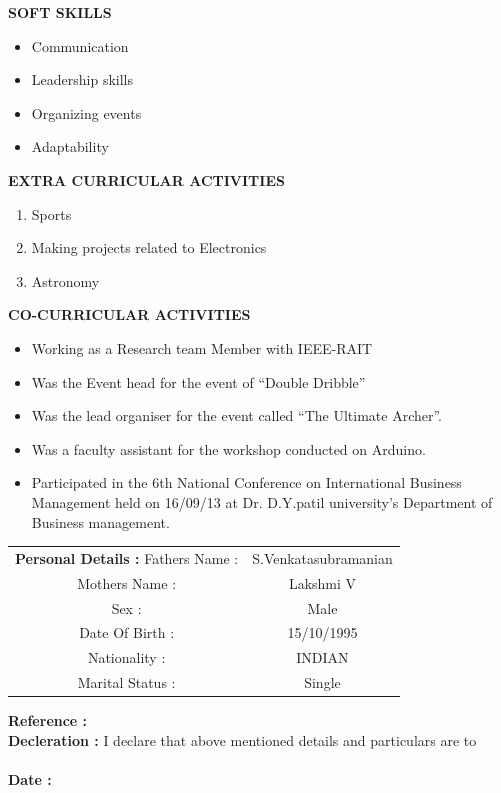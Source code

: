 \documentclass[a4paper]{article}
\begin{document}
\begin{flushleft}
\textbf {SOFT SKILLS}\\
\begin{itemize}
\item Communication
\item Leadership skills
\item Organizing events
\item Adaptability
\end{itemize}
\end{flushleft}

\begin{flushleft}
\textbf {EXTRA CURRICULAR ACTIVITIES}\\
\begin{enumerate}
\item Sports
\item Making projects related to Electronics
\item Astronomy
\end{enumerate}
\end{flushleft}


\begin{flushleft}
\vspace{2in}
\textbf {CO-CURRICULAR ACTIVITIES}\\
\begin{itemize}
\item Working as a Research team Member with IEEE-RAIT
\item 	Was the Event head for the event of  “Double Dribble”
\item 	Was the lead organiser for the event called “The Ultimate Archer”.
\item 	Was a  faculty assistant for the workshop conducted on Arduino.
\item 	Participated in the 6th National Conference on International Business Management held on 16/09/13 at Dr. D.Y.patil university’s Department of Business management.
\end{itemize}
\end{flushleft}

\vspace{2mm}
\begin{flushleft}
\begin{tabular}{ cc }
\textbf {Personal Details :  }
 \hfill Fathers Name : & S.Venkatasubramanian  \\ 
 \hfill Mothers Name : & Lakshmi V \\  
 \hfill Sex : & Male   \\ 
 \hfill Date Of Birth : &15/10/1995  \\
 \hfill Nationality : & INDIAN  \\
 \hfill Marital Status : & Single
\end{tabular}
\end{flushleft}

\begin{flushleft}
\textbf {Reference :  }\\
\textbf {Decleration  :}{ I declare that above mentioned details and particulars are to}\\
\hspace{0.9in}{ true to best of my knowledge.  }\\
\textbf {Date :}\hspace{0.5in}{21/05/2016  }
\end{flushleft}
\end{document}
